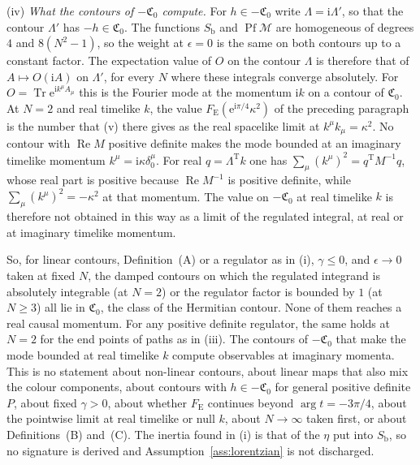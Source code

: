 (iv) \emph{What the contours of \(-\mathfrak C_0\) compute.} For \(h\in-\mathfrak C_0\) write \(\Lambda=\mathrm i\Lambda'\), so that the contour \(\Lambda'\) has \(-h\in\mathfrak C_0\). The functions \(S_{\mathrm b}\) and \(\operatorname{Pf}\mathcal M\) are homogeneous of degrees \(4\) and \(8(N^2-1)\), so the weight at \(\epsilon=0\) is the same on both contours up to a constant factor. The expectation value of \(O\) on the contour \(\Lambda\) is therefore that of \(A\mapsto O(\mathrm iA)\) on \(\Lambda'\), for every \(N\) where these integrals converge absolutely. For \(O=\operatorname{Tr}\mathrm e^{\mathrm ik^\mu A_\mu}\) this is the Fourier mode at the momentum \(\mathrm ik\) on a contour of \(\mathfrak C_0\). At \(N=2\) and real timelike \(k\), the value \(F_{\mathrm E}(\mathrm e^{\mathrm i\pi/4}\kappa^2)\) of the preceding paragraph is the number that (v) there gives as the real spacelike limit at \(k^\mu k_\mu=\kappa^2\). No contour with \(\operatorname{Re}M\) positive definite makes the mode bounded at an imaginary timelike momentum \(k^\mu=\mathrm i\kappa\delta^\mu_0\). For real \(q=\Lambda^{\mathrm T}k\) one has \(\sum_\mu(k^\mu)^2=q^{\mathrm T}M^{-1}q\), whose real part is positive because \(\operatorname{Re}M^{-1}\) is positive definite, while \(\sum_\mu(k^\mu)^2=-\kappa^2\) at that momentum. The value on \(-\mathfrak C_0\) at real timelike \(k\) is therefore not obtained in this way as a limit of the regulated integral, at real or at imaginary timelike momentum.

So, for linear contours, Definition~(A) or a regulator as in (i), \(\gamma\le0\), and \(\epsilon\to0\) taken at fixed \(N\), the damped contours on which the regulated integrand is absolutely integrable (at \(N=2\)) or the regulator factor is bounded by \(1\) (at \(N\ge3\)) all lie in \(\mathfrak C_0\), the class of the Hermitian contour. None of them reaches a real causal momentum. For any positive definite regulator, the same holds at \(N=2\) for the end points of paths as in (iii). The contours of \(-\mathfrak C_0\) that make the mode bounded at real timelike \(k\) compute observables at imaginary momenta. This is no statement about non-linear contours, about linear maps that also mix the colour components, about contours with \(h\in-\mathfrak C_0\) for general positive definite \(P\), about fixed \(\gamma>0\), about whether \(F_{\mathrm E}\) continues beyond \(\arg t=-3\pi/4\), about the pointwise limit at real timelike or null \(k\), about \(N\to\infty\) taken first, or about Definitions~(B) and~(C). The inertia found in (i) is that of the \(\eta\) put into \(S_{\mathrm b}\), so no signature is derived and Assumption~\ref{ass:lorentzian} is not discharged.
